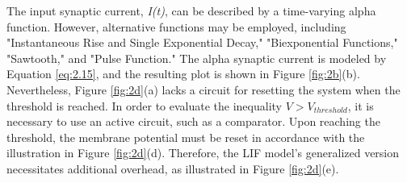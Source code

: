 \noindent The input synaptic current, \textit{I(t)}, can be described by a time-varying alpha function. However, alternative functions may be employed, including "Instantaneous Rise and Single Exponential Decay," "Biexponential Functions," "Sawtooth," and "Pulse Function." The alpha synaptic current is modeled by Equation \ref{eq:2.15}, and the resulting plot is shown in Figure \ref{fig:2b}(b). \\

\noindent Nevertheless, Figure \ref{fig:2d}(a) lacks a circuit for resetting the system when the threshold is reached. In order to evaluate the inequality $V > V_{threshold}$, it is necessary to use an active circuit, such as a comparator. Upon reaching the threshold, the membrane potential must be reset in accordance with the illustration in Figure \ref{fig:2d}(d). Therefore, the LIF model's generalized version necessitates additional overhead, as illustrated in Figure \ref{fig:2d}(e). \\





